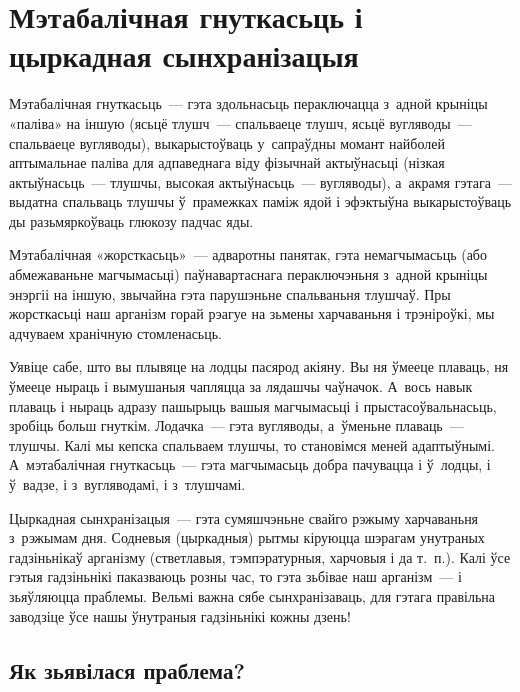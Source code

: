 \chapter[Мэтабалічная гнуткасьць і цыркадная сынхранізацыя][Мэтабалічная гнуткасьць]{Мэтабалічная гнуткасьць і цыркадная сынхранізацыя}

Мэтабалічная гнуткасьць~--- гэта здольнасьць пераключацца з~адной крыніцы «паліва» на іншую (ясьцё тлушч~--- спальваеце тлушч, ясьцё вугляводы~--- спальваеце вугляводы), выкарыстоўваць у~сапраўдны момант найболей аптымальнае паліва для адпаведнага віду фізычнай актыўнасьці (нізкая актыўнасьць~--- тлушчы, высокая актыўнасьць~--- вугляводы), а~акрамя гэтага~--- выдатна спальваць тлушчы ў~прамежках паміж ядой і эфэктыўна выкарыстоўваць ды разьмяркоўваць глюкозу падчас яды.

Мэтабалічная «жорсткасьць»~--- адваротны панятак, гэта немагчымасьць (або абмежаваньне магчымасьці) паўнавартаснага пераключэньня з~адной крыніцы энэргіі на іншую, звычайна гэта парушэньне спальваньня тлушчаў. Пры жорсткасьці наш арганізм горай рэагуе на зьмены харчаваньня і трэніроўкі, мы адчуваем хранічную стомленасьць.

Уявіце сабе, што вы плывяце на лодцы пасярод акіяну. Вы ня ўмееце плаваць, ня ўмееце ныраць і вымушаныя чапляцца за лядашчы чаўначок. А~вось навык плаваць і ныраць адразу пашырыць вашыя магчымасьці і прыстасоўвальнасьць, зробіць больш гнуткім. Лодачка~--- гэта вугляводы, а~ўменьне плаваць~--- тлушчы. Калі мы кепска спальваем тлушчы, то становімся меней адаптыўнымі. А~мэтабалічная гнуткасьць~--- гэта магчымасьць добра пачувацца і ў~лодцы, і ў~вадзе, і з~вугляводамі, і з~тлушчамі.

Цыркадная сынхранізацыя~--- гэта сумяшчэньне свайго рэжыму харчаваньня з~рэжымам дня. Содневыя (цыркадныя) рытмы кіруюцца шэрагам унутраных гадзіньнікаў арганізму (стветлавыя, тэмпэратурныя, харчовыя і да т.~п.). Калі ўсе гэтыя гадзіньнікі паказваюць розны час, то гэта зьбівае наш арганізм~--- і зьяўляюцца праблемы. Вельмі важна сябе сынхранізаваць, для гэтага правільна заводзіце ўсе нашы ўнутраныя гадзіньнікі кожны дзень!


\section{Як зьявілася праблема?}

